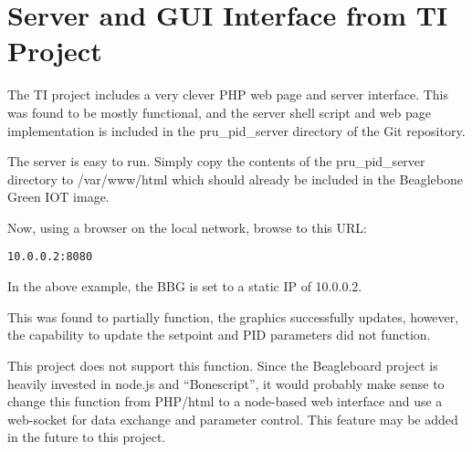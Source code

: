 \section{Server and GUI Interface from TI Project}

The TI project includes a very clever PHP web page and server interface.  This was found to be mostly functional, and the server shell script and web page implementation is included in the pru\_pid\_server directory of the Git repository.

The server is easy to run.  Simply copy the contents of the pru\_pid\_server directory to /var/www/html which should already be included in the Beaglebone Green IOT image.

Now, using a browser on the local network, browse to this URL:

\begin{verbatim}
10.0.0.2:8080
\end{verbatim}

In the above example, the BBG is set to a static IP of 10.0.0.2.

This was found to partially function, the graphics successfully updates, however, the capability to update the setpoint and PID parameters did not function.

This project does not support this function.  Since the Beagleboard project is heavily invested in node.js and ``Bonescript'', it would probably make sense to change this function from PHP/html to a node-based web interface and use a web-socket for data exchange and parameter control.  This feature may be added in the future to this project.
